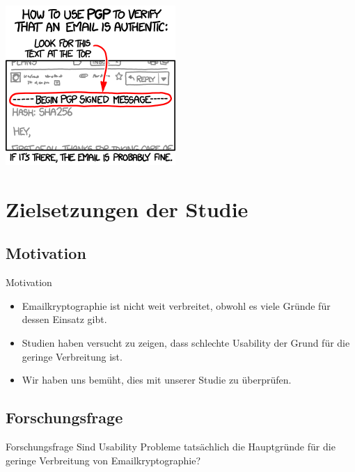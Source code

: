 \documentclass[]{beamer}
\begin{document}
\begin{frame}[plain]
	\titlepage
\end{frame}


\begin{frame}
	\begin{center}
		\includegraphics[scale=0.7]{pic/pgp.png}
	\end{center}

\end{frame}

\section{Zielsetzungen der Studie}

\subsection{Motivation}
\begin{frame}{Motivation}
\begin{itemize}
	\item Emailkryptographie ist nicht weit verbreitet, obwohl es viele Gründe für dessen Einsatz gibt.
	\item Studien haben versucht zu zeigen, dass schlechte Usability der Grund für die geringe Verbreitung ist.
	\item Wir haben uns bemüht, dies mit unserer Studie zu überprüfen.
\end{itemize}
\end{frame}


\subsection{Forschungsfrage}
\begin{frame}{Forschungsfrage}
	Sind Usability Probleme tatsächlich die Hauptgründe für die geringe Verbreitung von Emailkryptographie?

	\vspace{1.2cm}
\end{frame}
\end{document}
